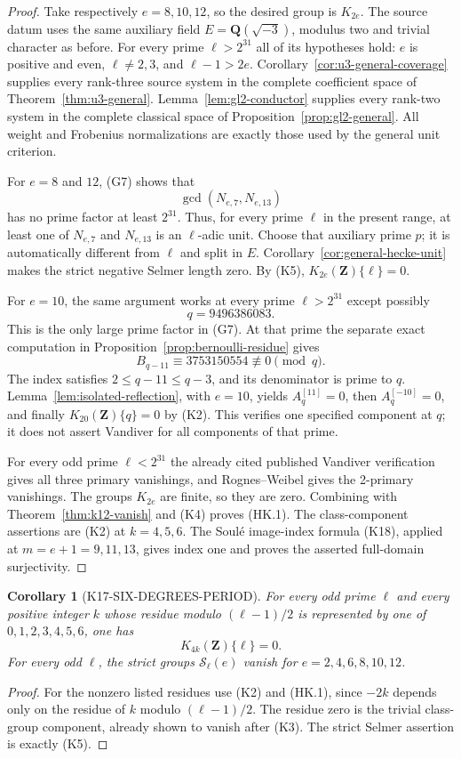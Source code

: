 \documentclass[11pt,a4paper]{article}
\newtheorem{corollary}[theorem]{Corollary}
\theoremstyle{definition}
\begin{document}
\begin{proof}
Take respectively $e=8,10,12$, so the desired group is $K_{2e}$.
The source datum uses the same auxiliary field
$E=\mathbf Q(\sqrt{-3})$, modulus two and trivial character as before.
For every prime $\ell>2^{31}$ all of its hypotheses hold: $e$ is
positive and even, $\ell\ne2,3$, and $\ell-1>2e$.
Corollary~\ref{cor:u3-general-coverage} supplies every rank-three
source system in the complete coefficient space of
Theorem~\ref{thm:u3-general}. Lemma~\ref{lem:gl2-conductor} supplies
every rank-two system in the complete classical space of
Proposition~\ref{prop:gl2-general}. All weight and Frobenius
normalizations are exactly those used by the general unit criterion.

For $e=8$ and $12$, (G7) shows that
\[
               \gcd(N_{e,7},N_{e,13})
\]
has no prime factor at least $2^{31}$. Thus, for every prime $\ell$
in the present range, at least one of $N_{e,7}$ and $N_{e,13}$ is
an $\ell$-adic unit. Choose that auxiliary prime $p$; it is automatically
different from $\ell$ and split in $E$.
Corollary~\ref{cor:general-hecke-unit} makes the strict negative Selmer
length zero. By (K5), $K_{2e}(\mathbf Z)\{\ell\}=0$.

For $e=10$, the same argument works at every prime $\ell>2^{31}$
except possibly
\[
                         q=9496386083.
\]
This is the only large prime factor in (G7). At that prime the separate
exact computation in Proposition~\ref{prop:bernoulli-residue} gives
\[
 B_{q-11}\equiv3753150554\not\equiv0\pmod q.
\]
The index satisfies $2\le q-11\le q-3$, and its denominator is prime
to $q$. Lemma~\ref{lem:isolated-reflection}, with $e=10$, yields
$A_q^{[11]}=0$, then $A_q^{[-10]}=0$, and finally
$K_{20}(\mathbf Z)\{q\}=0$ by (K2).
This verifies one specified component at $q$; it does not assert
Vandiver for all components of that prime.

For every odd prime $\ell<2^{31}$ the already cited published
Vandiver verification gives all three primary vanishings, and
Rognes--Weibel gives the 2-primary vanishings. The groups $K_{2e}$
are finite, so they are zero. Combining with
Theorem~\ref{thm:k12-vanish} and (K4) proves (HK.1).
The class-component assertions are (K2) at $k=4,5,6$.
The Soul\'e image-index formula (K18), applied at $m=e+1=9,11,13$,
gives index one and proves the asserted full-domain surjectivity.
\end{proof}

\begin{corollary}[K17-SIX-DEGREES-PERIOD]
\label{cor:six-degrees-period}
For every odd prime $\ell$ and every positive integer $k$ whose residue
modulo $(\ell-1)/2$ is represented by one of
$0,1,2,3,4,5,6$, one has
\[
                         K_{4k}(\mathbf Z)\{\ell\}=0.
\]
For every odd $\ell$, the strict groups
$\mathcal S_\ell(e)$ vanish for $e=2,4,6,8,10,12$.
\end{corollary}
\begin{proof}
For the nonzero listed residues use (K2) and (HK.1), since $-2k$
depends only on the residue of $k$ modulo $(\ell-1)/2$.
The residue zero is the trivial class-group component, already shown
to vanish after (K3). The strict Selmer assertion is exactly (K5).
\end{proof}
\end{document}
